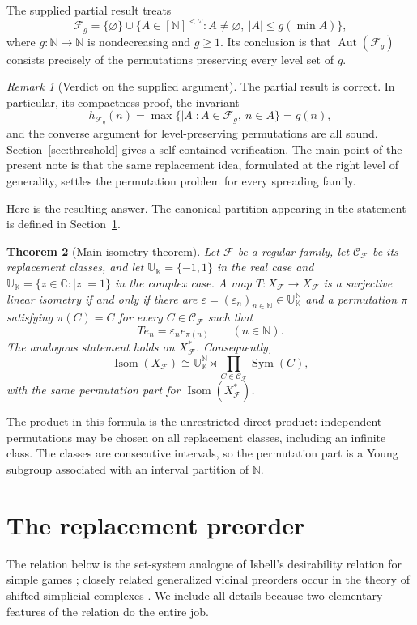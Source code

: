 \documentclass[11pt]{article}
\newtheorem{theorem}{Theorem}[section]
\theoremstyle{definition}
\theoremstyle{remark}
\newtheorem{remark}[theorem]{Remark}
\newcommand{\N}{\mathbb N}
\newcommand{\K}{\mathbb K}
\newcommand{\F}{\mathcal F}
\newcommand{\Ccal}{\mathcal C}
\newcommand{\U}{\mathbb U}
\newcommand{\Aut}{\operatorname{Aut}}
\newcommand{\Isom}{\operatorname{Isom}}
\newcommand{\Sym}{\operatorname{Sym}}
\begin{document}
The supplied partial result treats
\[
  \F_g=\{\varnothing\}\cup
  \bigl\{A\in[\N]^{<\omega}:A\ne\varnothing,
      \ |A|\le g(\min A)\bigr\},
\]
where $g:\N\to\N$ is nondecreasing and $g\ge1$.  Its conclusion is that
$\Aut(\F_g)$ consists precisely of the permutations preserving every level
set of $g$.

\begin{remark}[Verdict on the supplied argument]
The partial result is correct.  In particular, its compactness proof, the
invariant
\[
  h_{\F_g}(n)=\max\{|A|:A\in\F_g,\ n\in A\}=g(n),
\]
and the converse argument for level-preserving permutations are all sound.
Section~\ref{sec:threshold} gives a self-contained verification.  The main
point of the present note is that the same replacement idea, formulated at
the right level of generality, settles the permutation problem for every
spreading family.
\end{remark}

Here is the resulting answer.  The canonical partition appearing in the
statement is defined in Section~\ref{sec:preorder}.

\begin{theorem}[Main isometry theorem]\label{thm:main-isometry}
Let $\F$ be a regular family, let $\Ccal_{\F}$ be its replacement classes, and
let $\U_{\K}=\{-1,1\}$ in the real case and
$\U_{\K}=\{z\in\mathbb C:|z|=1\}$ in the complex case.  A map
$T:X_{\F}\to X_{\F}$ is a surjective linear isometry if and only if there are
$\varepsilon=(\varepsilon_n)_{n\in\N}\in\U_{\K}^{\N}$ and a permutation
$\pi$ satisfying $\pi(C)=C$ for every $C\in\Ccal_{\F}$ such that
\[
  T e_n=\varepsilon_n e_{\pi(n)}\qquad(n\in\N).
\]
The analogous statement holds on $X_{\F}^{*}$.  Consequently,
\[
  \Isom(X_{\F})\cong
  \U_{\K}^{\N}\rtimes
  \prod_{C\in\Ccal_{\F}}\Sym(C),
\]
with the same permutation part for $\Isom(X_{\F}^{*})$.
\end{theorem}

The product in this formula is the unrestricted direct product: independent
permutations may be chosen on all replacement classes, including an infinite
class.  The classes are consecutive intervals, so the permutation part is a
Young subgroup associated with an interval partition of $\N$.

\section{The replacement preorder}\label{sec:preorder}

The relation below is the set-system analogue of Isbell's desirability
relation for simple games \cite{Isbell}; closely related generalized vicinal
preorders occur in the theory of shifted simplicial complexes
\cite{Klivans}.  We include all details because two elementary features of
the relation do the entire job.
\end{document}
